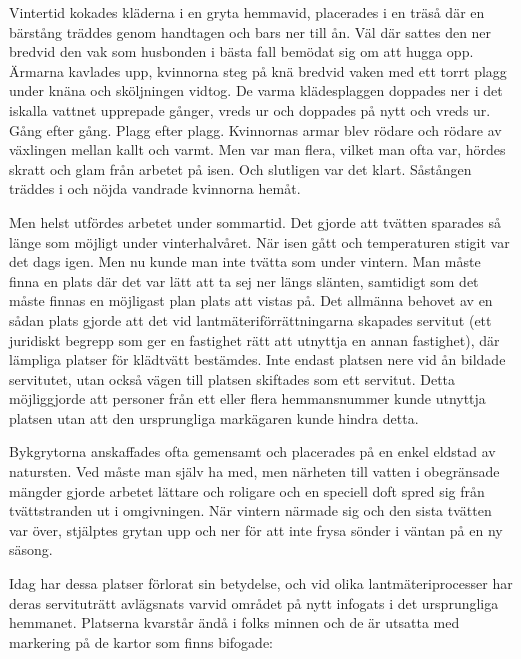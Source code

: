 Vintertid kokades kläderna  i en gryta hemmavid, placerades i en träså där en bärstång träddes genom handtagen och bars ner till ån. Väl där sattes den ner bredvid den vak som husbonden i bästa fall bemödat sig om att hugga opp. Ärmarna kavlades upp, kvinnorna steg på knä bredvid vaken med ett torrt plagg under knäna och sköljningen vidtog. De varma klädesplaggen doppades ner i det iskalla vattnet upprepade gånger, vreds ur och doppades på nytt och vreds ur. Gång efter gång. Plagg efter plagg. Kvinnornas armar blev rödare och rödare av växlingen mellan kallt och varmt. Men var man flera, vilket man ofta var, hördes skratt och glam från arbetet på isen. Och slutligen var det klart. Såstången träddes i och nöjda vandrade kvinnorna hemåt.

Men helst utfördes arbetet under sommartid. Det gjorde att tvätten sparades så länge som möjligt under vinterhalvåret. När isen gått och temperaturen stigit var det dags igen. Men nu kunde man inte tvätta som under vintern. Man måste finna en plats där det var lätt att ta sej ner längs slänten, samtidigt som det måste finnas en möjligast plan plats att vistas på. Det allmänna behovet av en sådan plats gjorde att det vid lantmäteriförrättningarna skapades servitut (ett juridiskt begrepp som ger en fastighet rätt att utnyttja en annan fastighet), där lämpliga platser för klädtvätt bestämdes. Inte endast platsen nere vid ån bildade servitutet, utan också vägen till platsen skiftades som ett servitut. Detta möjliggjorde att personer från ett eller flera hemmansnummer kunde utnyttja platsen utan att den ursprungliga markägaren kunde hindra detta.

Bykgrytorna anskaffades ofta gemensamt och placerades på en enkel eldstad av natursten. Ved måste man själv ha med, men närheten till vatten i obegränsade mängder gjorde arbetet lättare och roligare och en speciell doft spred sig från tvättstranden ut i omgivningen. När vintern närmade sig och den sista tvätten var över, stjälptes grytan upp och ner för att inte frysa sönder i väntan på en ny säsong.

Idag har dessa platser förlorat sin betydelse, och vid olika lantmäteriprocesser har deras servituträtt avlägsnats varvid området på nytt infogats i det ursprungliga hemmanet. Platserna kvarstår ändå i folks minnen och de är utsatta med  markering på de kartor som finns bifogade:

